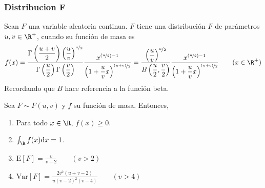 \subsubsection{Distribucion F}

\begin{Def}
  Sean $F$ una variable aleatoria continua. $F$ tiene una distribución
  $F$ de parámetros $u,v\in\R^+$, cuando su función de masa es
  \[f(x)=
  \dfrac{\Gamma\left(\frac{u+v}{2}\right)\left(\frac{u}{v}\right)^{\nicefrac{u}{2}}}
  {\Gamma\left(\frac{u}{2}\right)\Gamma\left(\frac{v}{2}\right)}
  \dfrac{x^{(\nicefrac{u}{2})-1}}
  {\left(1 + \frac{u}{v}x\right)^{\nicefrac{(u+v)}{2}}}
  =
  \dfrac{\left(\frac{u}{v}\right)^{\nicefrac{u}{2}}}
    {B\left(\frac{u}{2},\frac{v}{2}\right)}
  \dfrac{x^{(\nicefrac{u}{2})-1}}
    {\left(1 + \frac{u}{v}x\right)^{\nicefrac{(u+v)}{2}}}
  \qquad (x\in\R^+)
  \]
  Recordando que $B$ hace referencia a la función beta.
\end{Def}
\begin{Teo}
  Sea $F\sim F(u,v)$ y $f$ su función de masa. Entonces,
  \begin{enumerate}
    \item Para todo $x\in\R$, $f(x) \geq 0$.
    \item $\int_{\R}f(x)\mathrm{d}x=1$.
    \item $\text{E}[F]=\frac{v}{v-2} \qquad(v>2)$
    \item $\text{Var}[F]=\frac{2v^2(u+v-2)}{u(v-2)^2(v-4)}\qquad(v>4)$
  \end{enumerate}
\end{Teo}
